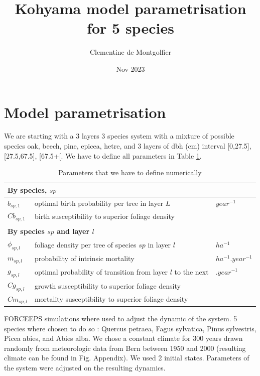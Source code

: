 \documentclass{article}
\title{Kohyama model parametrisation for 5 species}
\author{Clementine de Montgolfier}
\date{Nov 2023}
\begin{document}
\maketitle

\section{Model parametrisation}

We are starting with a 3 layers 3 species system with a mixture of possible species oak, beech, pine, epicea, hetre, and 3 layers of dbh (cm) interval [0,27.5], [27.5,67.5], [67.5+[. We have to define all parameters in Table \ref{tab:coeftoparam}.

\begin{table}[H]
    \centering
    \begin{tabular}{l l l}
    \hline
    \hline
    \multicolumn{3}{l}{\textbf{By species}, $sp$} \\
    \hline
    $b_{sp,1}$     & optimal birth probability per tree in layer $L$ & $year^{-1}$ \\
    $Cb_{sp,1}$    & birth susceptibility to superior foliage density& \\
    \\
    \multicolumn{3}{l}{\textbf{By species $sp$ and layer $l$}} \\
    \hline
    $\phi_{sp,l}$  & foliage density per tree of species $sp$ in layer $l$  & $ha^{-1}$  \\
    $m_{sp,l}$     & probability of intrinsic mortality                     & $ha^{-1}.year^{-1}$ \\  
    $g_{sp,l}$     & optimal probability of transition from layer $l$ to the next   & $.year^{-1}$ \\
    $Cg_{sp,l}$    & growth susceptibility to superior foliage density      &            \\
    $Cm_{sp,l}$    & mortality susceptibility to superior foliage density   &            \\
    \hline
    \hline
    \end{tabular}
    \caption{Parameters that we have to define numerically}
    \label{tab:coeftoparam}
\end{table}

FORCEEPS simulations where used to adjust the dynamic of the system. 5 species where chosen to do so : Quercus petraea, Fagus sylvatica, Pinus sylvestris, Picea abies, and Abies alba. We chose a constant climate for 300 years drawn randomly from meteorologic data from Bern between 1950 and 2000 (resulting climate can be found in Fig. Appendix). We used 2 initial states. Parameters of the system were adjusted on the resulting dynamics.\\
\end{document}
